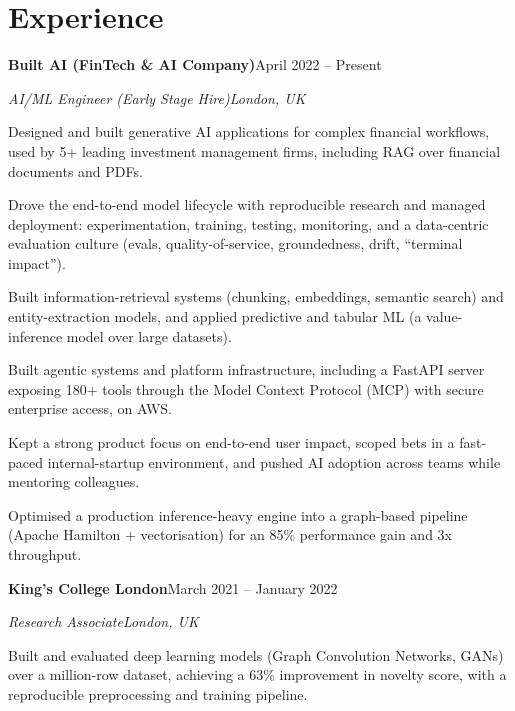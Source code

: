 \documentclass[10pt,a4paper]{article}
\newcommand{\entry}[4]{%
  {\color{company}\bfseries #1}\hfill {\color{muted}#2}\par
  \vspace{1pt}
  {\itshape #3}\hfill {\color{muted}\itshape #4}\par
  \vspace{3pt}%
}
\begin{document}
\section{Experience}
\entry{Built AI (FinTech \& AI Company)}{April 2022 -- Present}{AI/ML Engineer (Early Stage Hire)}{London, UK}
\begin{tight}
  \item Designed and built generative AI applications for complex financial workflows, used by 5+ leading investment management firms, including RAG over financial documents and PDFs.
  \item Drove the end-to-end model lifecycle with reproducible research and managed deployment: experimentation, training, testing, monitoring, and a data-centric evaluation culture (evals, quality-of-service, groundedness, drift, ``terminal impact'').
  \item Built information-retrieval systems (chunking, embeddings, semantic search) and entity-extraction models, and applied predictive and tabular ML (a value-inference model over large datasets).
  \item Built agentic systems and platform infrastructure, including a FastAPI server exposing 180+ tools through the Model Context Protocol (MCP) with secure enterprise access, on AWS.
  \item Kept a strong product focus on end-to-end user impact, scoped bets in a fast-paced internal-startup environment, and pushed AI adoption across teams while mentoring colleagues.
  \item Optimised a production inference-heavy engine into a graph-based pipeline (Apache Hamilton + vectorisation) for an 85\% performance gain and 3x throughput.
\end{tight}

\entry{King's College London}{March 2021 -- January 2022}{Research Associate}{London, UK}
\begin{tight}
  \item Built and evaluated deep learning models (Graph Convolution Networks, GANs) over a million-row dataset, achieving a 63\% improvement in novelty score, with a reproducible preprocessing and training pipeline.
\end{tight}

\end{document}
